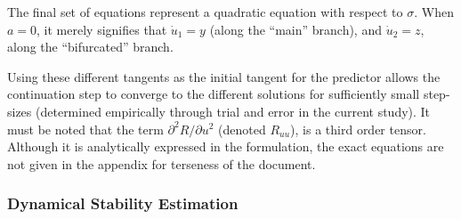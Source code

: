 \documentclass[10pt]{article}
\begin{document}
The final set of equations represent a quadratic equation with respect
to $\sigma$. When $a=0$, it merely signifies that $\dot{u}_1 = y$
(along the ``main'' branch), and $\dot{u}_2 = z$, along the
``bifurcated'' branch.

Using these different tangents as the initial tangent for the
predictor allows the continuation step to converge to the different
solutions for sufficiently small step-sizes (determined empirically
through trial and error in the current study). It must be noted that
the term $\partial^2 R/\partial u^2$ (denoted $R_{uu}$), is a third
order tensor. Although it is analytically expressed in the
formulation, the exact equations are not given in the appendix for
terseness of the document.

\subsubsection{Dynamical Stability Estimation}
\label{sec:dynam-stab-estim}
\end{document}
